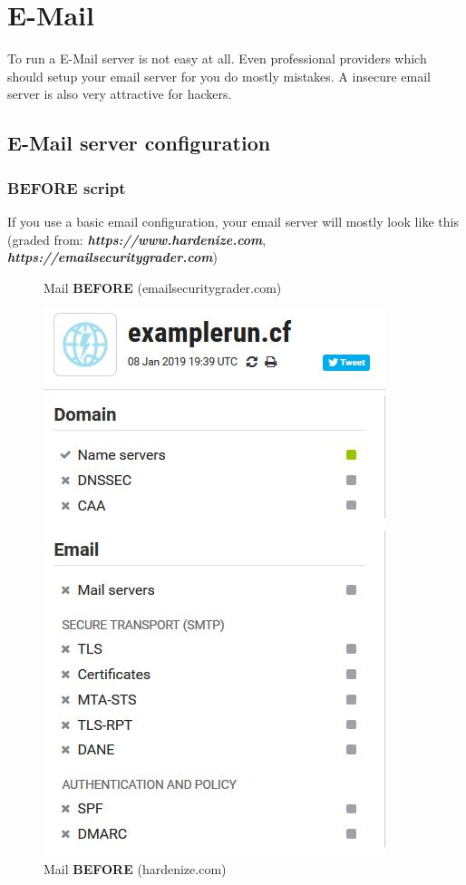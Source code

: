 
\section{E-Mail}
To run a E-Mail server is not easy at all. Even professional providers which should setup your email server for you do mostly mistakes. A insecure email server is also very attractive for hackers. 
\subsection{E-Mail server configuration} 
\subsubsection{BEFORE script}
If you use a basic email configuration, your email server will mostly look like this (graded from: \textbf{\textit{https://www.hardenize.com}}, \textbf{\textit{https://emailsecuritygrader.com}})
\begin{figure}[H]
	\centering
	\caption{Mail \textbf{BEFORE} (emailsecuritygrader.com)}
	\label{fig:emailbeforetest}
\end{figure}
\begin{figure}[H]
	\centering
	\includegraphics[width=0.3\linewidth]{pics/hardenize_before}
	\caption{Mail \textbf{BEFORE} (hardenize.com)}
	\label{fig:hardenizebefore}
\end{figure}

